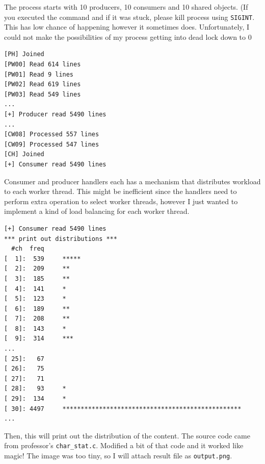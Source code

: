 \documentclass{homework}
\begin{document}
The process starts with 10 producers, 10 consumers and 10 shared objects. (If you executed the command and if it was stuck, please kill process using \texttt{SIGINT}. This has low chance of happening however it sometimes does. Unfortunately, I could not make the possibilities of my process getting into dead lock down to 0%
\\

\begin{center}
\begin{code}
\begin{verbatim}
[PH] Joined
[PW00] Read 614 lines
[PW01] Read 9 lines
[PW02] Read 619 lines
[PW03] Read 549 lines
...
[+] Producer read 5490 lines
...
[CW08] Processed 557 lines
[CW09] Processed 547 lines
[CH] Joined
[+] Consumer read 5490 lines
\end{verbatim}
\end{code}
\end{center}

\pagebreak
Consumer and producer handlers each has a mechanism that distributes workload to each worker thread. This might be inefficient since the handlers need to perform extra operation to select worker threads, however I just wanted to implement a kind of load balancing for each worker thread. 
\\

\begin{center}
\begin{code}
\begin{verbatim}
[+] Consumer read 5490 lines
*** print out distributions ***
  #ch  freq
[  1]:  539     *****
[  2]:  209     **
[  3]:  185     **
[  4]:  141     *
[  5]:  123     *
[  6]:  189     **
[  7]:  208     **
[  8]:  143     *
[  9]:  314     ***
...
[ 25]:   67
[ 26]:   75
[ 27]:   71
[ 28]:   93     *
[ 29]:  134     *
[ 30]: 4497     *************************************************
...
\end{verbatim}
\end{code}
\end{center}

Then, this will print out the distribution of the content. The source code came from professor’s \texttt{char_stat.c}. Modified a bit of that code and it worked like magic! The image was too tiny, so I will attach result file as \texttt{output.png}.
\par
\end{document}
